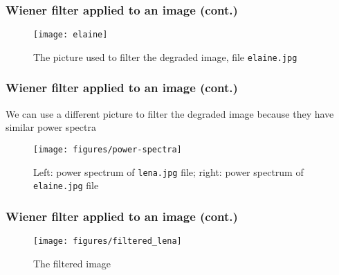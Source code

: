 \documentclass[10pt]{beamer}
\begin{document}
\begin{frame}
  \frametitle{Wiener filter applied to an image (cont.)}
  \begin{figure}
    \centering
    \texttt{[image: elaine]}
    \caption{The picture used to filter the degraded image, file
      \texttt{elaine.jpg}}
  \end{figure}
\end{frame}

\begin{frame}
  \frametitle{Wiener filter applied to an image (cont.)}
  We can use a different picture to filter the degraded image because they have
  similar power spectra
  \begin{figure}
    \centering
    \texttt{[image: figures/power-spectra]}
    \caption{Left: power spectrum of \texttt{lena.jpg} file; right: power
      spectrum of \texttt{elaine.jpg} file}
  \end{figure}
\end{frame}

\begin{frame}
  \frametitle{Wiener filter applied to an image (cont.)}
  \begin{figure}
    \centering
    \texttt{[image: figures/filtered\_lena]}
    \caption{The filtered image}
  \end{figure}
\end{frame}

\begin{frame}
  \frametitle{\refname}
  \nocite{*}
  \printbibliography{}
\end{frame}
\end{document}

